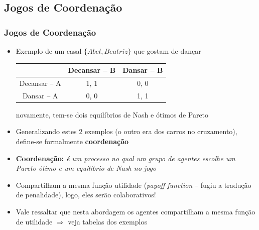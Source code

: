 

\subsection{Jogos de Coordenação}

\begin{frame}
\frametitle{Jogos de Coordenação}

\begin{itemize}
  \item Exemplo de um casal $\{Abel, Beatriz\}$ que gostam de dançar
    \begin{center}
      \begin{tabular}{c || c | c}
                 & Decansar -- B & Dansar -- B \\ \hline  \hline
      Decansar -- A   & 1, 1     &  0, 0      \\ \hline
      Dansar -- A     & 0, 0     &  1, 1         \\ \hline
      \end{tabular}
    \end{center}

novamente, tem-se dois equilíbrios de Nash e ótimos de Pareto

\item Generalizando estes 2 exemplos (o outro era dos carros no cruzamento), 
define-se formalmente  \textbf{coordenação}
 
 \item \textbf{Coordenação:} \textit{é um processo no qual  um grupo de agentes escolhe um Pareto ótimo e um equílibrio de Nash no jogo}
 
 \item Compartilham a mesma função utilidade
  (\textit{payoff function} -- fugiu a tradução de penalidade), logo, eles  serão
  colaborativos!
 
  \item Vale ressaltar que nesta abordagem os agentes compartilham a mesma função de utilidade $\Rightarrow $ veja tabelas dos exemplos
  
 
\end{itemize}
\end{frame}
















